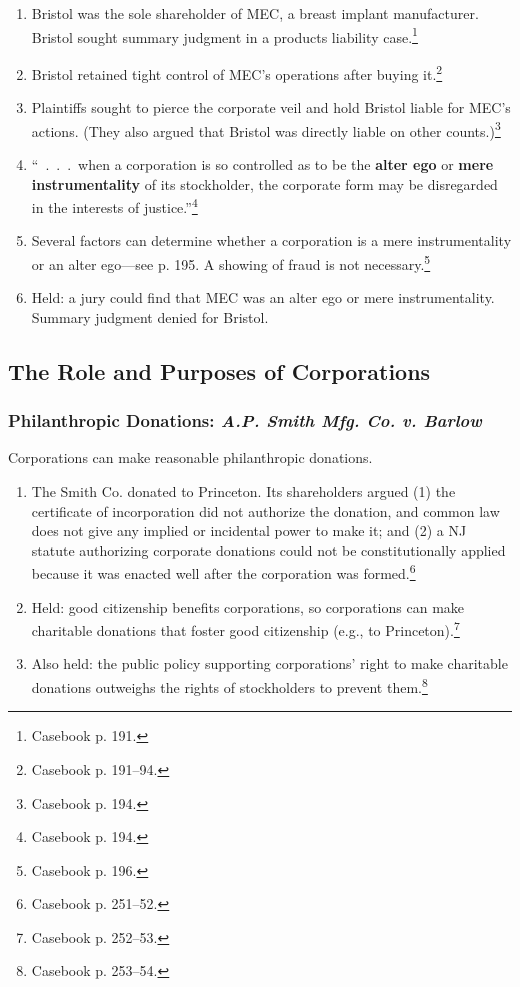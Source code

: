 \begin{enumerate}
    \item Bristol was the sole shareholder of MEC, a breast implant 
    manufacturer. Bristol sought summary judgment in a products liability 
    case.\footnote{Casebook p. 191.}
    \item Bristol retained tight control of MEC's operations after buying 
    it.\footnote{Casebook p. 191--94.}
    \item Plaintiffs sought to pierce the corporate veil and hold Bristol 
    liable for MEC's actions. (They also argued that Bristol was directly 
    liable on other counts.)\footnote{Casebook p. 194.}
    \item ``~.~.~.~when a corporation is so controlled as to be the 
    \textbf{alter ego} or \textbf{mere instrumentality} of its stockholder, 
    the corporate form may be disregarded in the interests of 
    justice.''\footnote{Casebook p. 194.}
    \item Several factors can determine whether a corporation is a mere 
    instrumentality or an alter ego---see p. 195. A showing of fraud is not 
    necessary.\footnote{Casebook p. 196.}
    \item Held: a jury could find that MEC was an alter ego or mere 
    instrumentality. Summary judgment denied for Bristol.
\end{enumerate}

\subsection{The Role and Purposes of Corporations}

\subsubsection{Philanthropic Donations: \emph{A.P. Smith Mfg. Co. v. Barlow}}

Corporations can make reasonable philanthropic donations.

\begin{enumerate}
    \item The Smith Co. donated to Princeton. Its shareholders argued (1) the 
    certificate of incorporation did not authorize the donation, and common 
    law does not give any implied or incidental power to make it; and (2) a NJ 
    statute authorizing corporate donations could not be constitutionally 
    applied because it was enacted well after the corporation was 
    formed.\footnote{Casebook p. 251--52.}
    \item Held: good citizenship benefits corporations, so corporations can 
    make charitable donations that foster good citizenship (e.g., to 
    Princeton).\footnote{Casebook p. 252--53.}
    \item Also held: the public policy supporting corporations' right to make 
    charitable donations outweighs the rights of stockholders to prevent 
    them.\footnote{Casebook p. 253--54.}
\end{enumerate}

